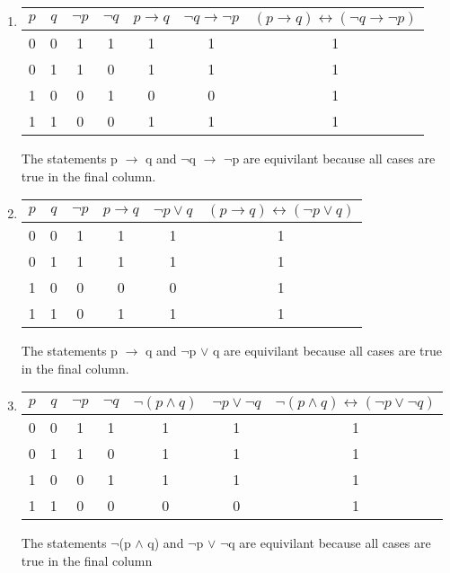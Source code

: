 \documentclass[11pt]{article}
\begin{document}
\begin{enumerate}
\item
\begin{tabular}{|c|c|c|c|c|c|c|}
\hline
$p$ & $q$ & $\lnot p$ & $\lnot q$ & $p \rightarrow q$ & $\lnot q \rightarrow  \lnot p$ & $(p \rightarrow q) \leftrightarrow  (\lnot q \rightarrow \lnot p)$ \\
\hline
0 & 0 & 1 & 1 & 1 & 1 & 1\\
0 & 1 & 1 & 0 & 1 & 1 & 1\\
1 & 0 & 0 & 1 & 0 & 0 & 1\\
1 & 1 & 0 & 0 & 1 & 1 & 1\\
\hline
\end{tabular}
\newline
The statements p $\rightarrow$ q and $\neg$q $\rightarrow$ $\neg$p are equivilant because all cases are true in the final column.
\item
\begin{tabular}{|c|c|c|c|c|c|}
\hline
$p$ & $q$ & $\lnot p$ & $p \rightarrow q$ & $\lnot p \lor q$ & $(p \rightarrow q) \leftrightarrow  (\lnot p \lor q)$ \\
\hline
0 & 0 & 1 & 1 & 1 & 1\\
0 & 1 & 1 & 1 & 1 & 1\\
1 & 0 & 0 & 0 & 0 & 1\\
1 & 1 & 0 & 1 & 1 & 1\\
\hline
\end{tabular}
\newline
The statements p $\rightarrow$ q and $\neg$p $\lor$ q are equivilant because all cases are true in the final column.

\item
\begin{tabular}{|c|c|c|c|c|c|c|}
\hline
$p$ & $q$ & $\lnot p$ & $\lnot q$ & $\lnot(p \land q)$ & $\lnot p \lor  \lnot q$ & $\lnot(p \land q) \leftrightarrow  (\lnot p \lor \lnot q)$ \\
\hline
0 & 0 & 1 & 1 & 1 & 1 & 1\\
0 & 1 & 1 & 0 & 1 & 1 & 1\\
1 & 0 & 0 & 1 & 1 & 1 & 1\\
1 & 1 & 0 & 0 & 0 & 0 & 1\\
\hline
\end{tabular}
\newline
The statements $\neg$(p $\wedge$ q) and $\neg$p $\lor$ $\neg$q are equivilant because all cases are true in the final column
\end{enumerate}
\end{document}
